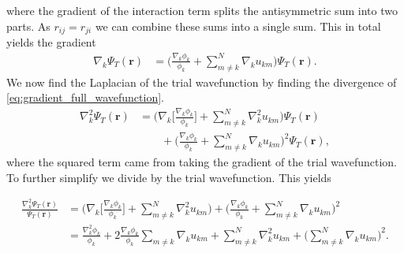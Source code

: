 \documentclass[
    a4paper, aps, twocolumn, floatfix, superscriptaddress]{revtex4-1}
\newcommand{\vf}{\mathbf}
\newcommand{\1}{\mathds{1}}
\begin{document}
            where the gradient of the interaction term splits the antisymmetric
            sum into two parts. As $r_{ij} = r_{ji}$ we can combine these sums
            into a single sum. This in total yields the gradient
            \begin{align}
                \nabla_k\Psi_T(\vf{r})
                &=
                \Biggl(
                    \frac{\nabla_k\phi_k}{\phi_k}
                    + \sum_{m \neq k}^N
                    \nabla_k u_{km}
                \Biggr)
                \Psi_T(\vf{r}).
                \label{eq:gradient_full_wavefunction}
            \end{align}
            We now find the Laplacian of the trial wavefunction by finding the
            divergence of \autoref{eq:gradient_full_wavefunction}.
            \begin{align}
                \nabla_k^2\Psi_T(\vf{r})
                &=
                \Biggl(
                    \nabla_k\Biggl[
                        \frac{\nabla_k\phi_k}{\phi_k}
                    \Biggr]
                    +
                    \sum_{m \neq k}^N \nabla_k^2 u_{km}
                \Biggr)\Psi_T(\vf{r})
                \\
                &\qquad
                +
                \Biggl(
                    \frac{\nabla_k\phi_k}{\phi_k}
                    + \sum_{m \neq k}^N
                    \nabla_k u_{km}
                \Biggr)^2
                \Psi_T(\vf{r}),
            \end{align}
            where the squared term came from taking the gradient of the trial
            wavefunction.  To further simplify we divide by the trial
            wavefunction. This yields
            \begin{widetext}
                \begin{align}
                    \frac{\nabla_k^2\Psi_T(\vf{r})}{\Psi_T(\vf{r})}
                    &=
                    \Biggl(
                        \nabla_k\Biggl[
                            \frac{\nabla_k\phi_k}{\phi_k}
                        \Biggr]
                        +
                        \sum_{m \neq k}^N \nabla_k^2 u_{km}
                    \Biggr)
                    +
                    \Biggl(
                        \frac{\nabla_k\phi_k}{\phi_k}
                        + \sum_{m \neq k}^N
                        \nabla_k u_{km}
                    \Biggr)^2 \\
                    &=
                    \frac{\nabla_k^2\phi_k}{\phi_k}
                    + 2\frac{\nabla_k\phi_k}{\phi_k}
                    \sum_{m \neq k}\nabla_k u_{km}
                    + \sum_{m\neq k}^N\nabla_k^2 u_{km}
                    + \Biggl(
                        \sum_{m \neq k}^N\nabla_k u_{km}
                    \Biggr)^2.
                \end{align}
            \end{widetext}
\end{document}
